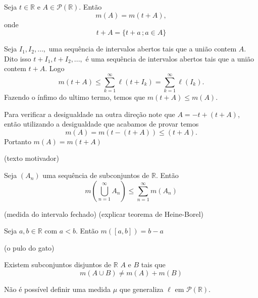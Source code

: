 \documentclass[a4paper, 11pt]{book}
\theoremstyle{definition}
\newcommand{\bR}{\mathbb{R}}
\newcommand{\cP}{\mathcal{P}}
\begin{document}
\begin{pbox}
    Seja $t \in \bR$ e $A \in \cP(\bR)$.
    Então
    \[
        m(A) = m(t + A),
    \]
    onde 
    \[
        t + A = \{t + a \,; a \in A\}
    \]
\end{pbox}
\begin{prf}
    Seja $I_1,I_2,\dots,$ uma sequência de intervalos abertos tais que a união contem $A$.
    Dito isso $t + I_1, t+ I_2,...,$ é uma sequência de intervalos abertos tais que a união contem $t + A$.
    Logo
    \[
        m(t + A) \leqslant \sum_{k=1}^{\infty} \ell(t + I_k) = \sum_{k=1}^{\infty} \ell(I_k).
    \]
    Fazendo o ínfimo do ultimo termo, temos que $m(t + A) \leqslant m(A)$.

    Para verificar a desigualdade na outra direção note que $A = -t + (t + A)$, então utilizando a desigualdade que acabamos de provar temos
    \[
        m(A) = m(t - (t + A)) \leqslant (t + A).
    \]
    Portanto $m(A) = m(t + A)$
\end{prf}

(texto motivador)

\begin{pbox}
    Seja $(A_n)$ uma sequência de subconjuntos de $\bR$. Então
    \[
        m\left( \bigcup_{n=1}^{\infty} A_n \right) \leqslant \sum_{n=1}^{\infty} m(A_n)
    \]
\end{pbox}
\begin{prf}
    
\end{prf}

(medida do intervalo fechado)
(explicar teorema de Heine-Borel)

\begin{pbox}
    Seja $a, b \in \bR$ com $a < b$.
    Então $m([a,b]) = b -a$
\end{pbox}

(o pulo do gato)

\begin{pbox}
    Existem subconjuntos disjuntos de $\bR$ $A$ e $B$ tais que
    \[
        m(A \cup B) \neq m(A) + m(B)
    \]
\end{pbox}
\begin{prf}
    
\end{prf}

\begin{tbox}
    Não é possível definir uma medida $\mu$ que generaliza $\ell$ em $\cP(\bR)$.
\end{tbox}
\begin{prf}
    
\end{prf}
\end{document}
